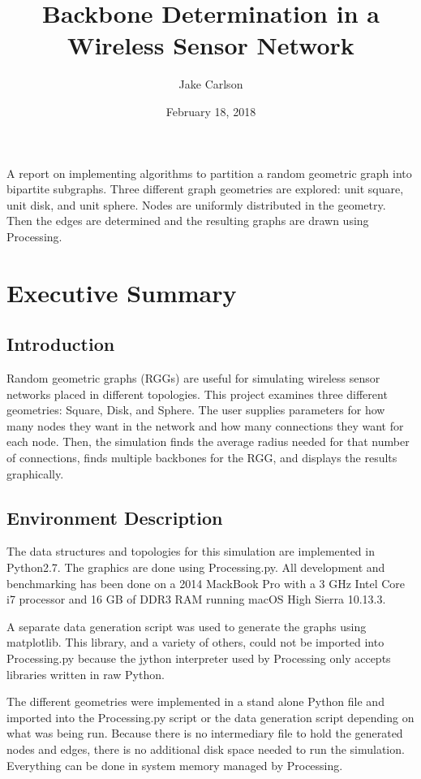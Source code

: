 \documentclass{article}
\begin{document}
\title{Backbone Determination in a Wireless Sensor Network}
\author{Jake Carlson}
\date{February 18, 2018}
\maketitle

\abstract
A report on implementing algorithms to partition a random geometric graph into bipartite subgraphs. Three different graph geometries are explored: unit square, unit disk, and unit sphere. Nodes are uniformly distributed in the geometry. Then the edges are determined and the resulting graphs are drawn using Processing.
\newpage

\tableofcontents
\lstlistoflistings
\newpage

\section{Executive Summary}

    \subsection{Introduction}
    Random geometric graphs (RGGs) are useful for simulating wireless sensor networks placed in different topologies. This project examines three different geometries: Square, Disk, and Sphere. The user supplies parameters for how many nodes they want in the network and how many connections they want for each node. Then, the simulation finds the average radius needed for that number of connections, finds multiple backbones for the RGG, and displays the results graphically.

    \subsection{Environment Description}
    The data structures and topologies for this simulation are implemented in Python2.7. The graphics are done using Processing.py. All development and benchmarking has been done on a 2014 MackBook Pro with a 3 GHz Intel Core i7 processor and 16 GB of DDR3 RAM running macOS High Sierra 10.13.3.
    \par
    A separate data generation script was used to generate the graphs using matplotlib. This library, and a variety of others, could not be imported into Processing.py because the jython interpreter used by Processing only accepts libraries written in raw Python.
    \par
    The different geometries were implemented in a stand alone Python file and imported into the Processing.py script or the data generation script depending on what was being run. Because there is no intermediary file to hold the generated nodes and edges, there is no additional disk space needed to run the simulation. Everything can be done in system memory managed by Processing.
\end{document}
